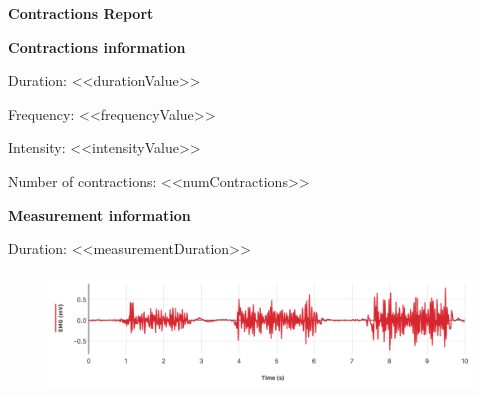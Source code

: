 \documentclass{article}
\begin{document}
\begin{center}
    \textbf{\LARGE{Contractions Report}}
\end{center}

\vspace{12pt}

\textbf{\Large{Contractions information}}

\vspace{7pt}

Duration: <<durationValue>>

\vspace{2pt}

Frequency: <<frequencyValue>>

\vspace{2pt}

Intensity: <<intensityValue>>

\vspace{2pt}

Number of contractions: <<numContractions>>

\vspace{20pt}

\textbf{\Large{Measurement information}}

\vspace{7pt}

Duration: <<measurementDuration>>

\begin{figure}[h]
    \centering
    \includegraphics[width=\textwidth]{Imagenes/emg_signal.png}
    \label{fig:enter-label}
\end{figure}
\end{document}
